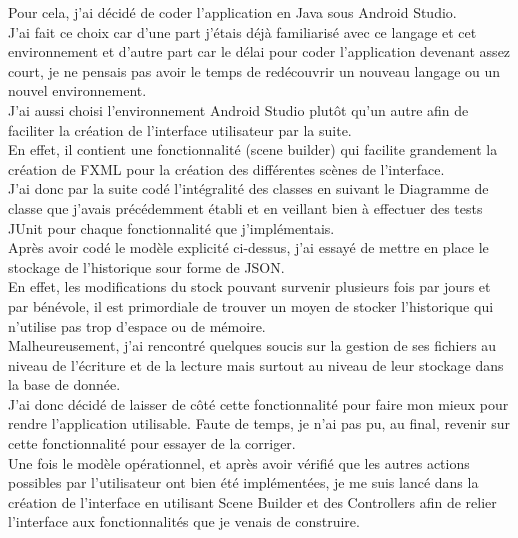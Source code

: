 \documentclass[11pt, twoside]{article}
\begin{document}
Pour cela, j'ai décidé de coder l'application en Java\cite{Java} sous Android Studio\cite{AndroidStudio}. \\
J'ai fait ce choix car d'une part j'étais déjà familiarisé avec ce langage et cet environnement et d'autre part car le délai pour coder l'application devenant assez court, je ne pensais pas avoir le temps de redécouvrir un nouveau langage ou un nouvel environnement. \\
J'ai aussi choisi l'environnement Android Studio\cite{AndroidStudio} plutôt qu'un autre afin de faciliter la création de l'interface utilisateur par la suite.\\
En effet, il contient une fonctionnalité (scene builder) qui facilite grandement la création de FXML pour la création des différentes scènes de l'interface.
\vspace*{0.2cm}\\
J'ai donc par la suite codé l'intégralité des classes en suivant le Diagramme de classe que j'avais précédemment établi et en veillant bien à effectuer des tests JUnit pour chaque fonctionnalité que j'implémentais.
\vspace*{0.2cm}\\
Après avoir codé le modèle explicité ci-dessus, j'ai essayé de mettre en place le stockage de l'historique sour forme de JSON.\\
En effet, les modifications du stock pouvant survenir plusieurs fois par jours et par bénévole, il est primordiale de trouver un moyen de stocker l'historique qui n'utilise pas trop d'espace ou de mémoire.\\
Malheureusement, j'ai rencontré quelques soucis sur la gestion de ses fichiers au niveau de l'écriture et de la lecture mais surtout au niveau de leur stockage dans la base de donnée.\\
J'ai donc décidé de laisser de côté cette fonctionnalité pour faire mon mieux pour rendre l'application utilisable. 
Faute de temps, je n'ai pas pu, au final, revenir sur cette fonctionnalité pour essayer de la corriger.
\vspace*{0.2cm}\\
Une fois le modèle opérationnel, et après avoir vérifié que les autres actions possibles par l'utilisateur ont bien été implémentées, je me suis lancé dans la création de l'interface en utilisant Scene Builder et des Controllers afin de relier l'interface aux fonctionnalités que je venais de construire.
\end{document}
